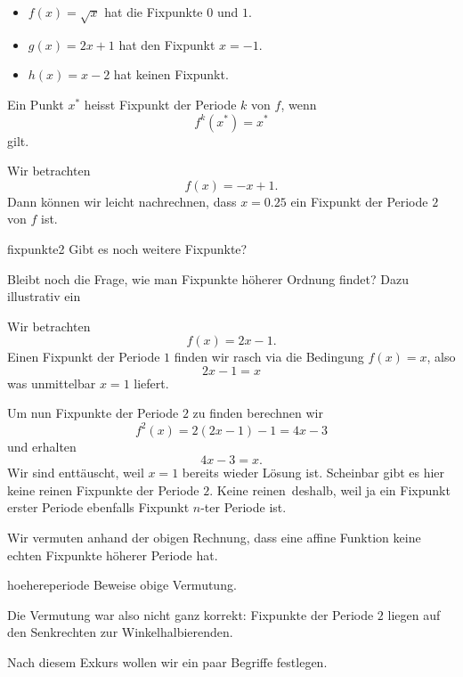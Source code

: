 \documentclass[%
<<<<<<< Updated upstream
11pt,%
twoside,%
titlepage,%
german,%
headsepline%
]{scrartcl}
\begin{document}
\begin{bsps}

\begin{itemize}
\item $f(x)=\sqrt{x}$ hat die Fixpunkte $0$ und $1$.
\item $g(x)=2x+1$ hat den Fixpunkt $x=-1$.
\item $h(x)=x-2$ hat keinen Fixpunkt.
\end{itemize}
\end{bsps}
\begin{cdef}
Ein Punkt $x^*$ heisst Fixpunkt der Periode $k$ von $f$, wenn
$$f^k(x^*)=x^*$$
gilt.
\end{cdef}
\begin{bsp}
Wir betrachten
$$f(x)=-x+1.$$
Dann können wir leicht nachrechnen, dass $x=0.25$ ein Fixpunkt der Periode $2$ von $f$ ist.
\end{bsp}

\begin{uebenv}{fixpunkte2}
Gibt es noch weitere Fixpunkte?
\end{uebenv}



Bleibt noch die Frage, wie man Fixpunkte höherer Ordnung findet? Dazu illustrativ ein

\begin{bsp}
Wir betrachten
$$f(x)=2x-1.$$
Einen Fixpunkt der Periode $1$ finden wir rasch via die Bedingung $f(x)=x$, also
$$2x-1=x$$
was unmittelbar $x=1$ liefert.

Um nun Fixpunkte der Periode $2$ zu finden berechnen wir
$$f^2(x)=2(2x-1)-1=4x-3$$
und erhalten
$$4x-3=x.$$
Wir sind enttäuscht, weil $x=1$ bereits wieder Lösung ist. Scheinbar gibt es hier keine reinen Fixpunkte der Periode $2$. \glqq Keine reinen\grqq\ deshalb, weil ja ein Fixpunkt erster Periode ebenfalls Fixpunkt $n$-ter Periode ist.
\end{bsp}

Wir vermuten anhand der obigen Rechnung, dass eine affine Funktion keine echten Fixpunkte höherer Periode hat.

\begin{uebenv}{hoehereperiode}
Beweise obige Vermutung.
\end{uebenv}



Die Vermutung war also nicht ganz korrekt: Fixpunkte der Periode $2$ liegen auf den Senkrechten zur Winkelhalbierenden.

Nach diesem Exkurs wollen wir ein paar Begriffe festlegen.
\end{document}
